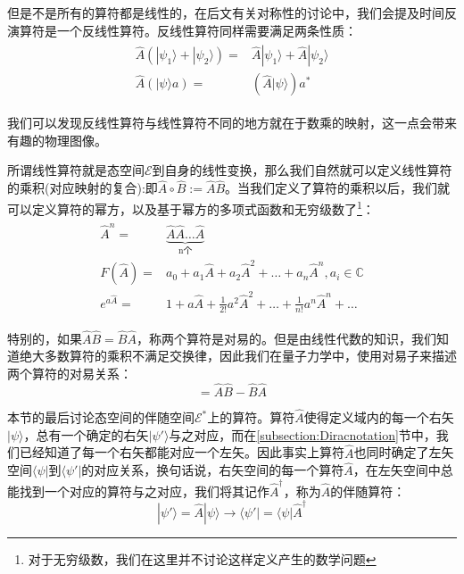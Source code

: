         但是不是所有的算符都是线性的，在后文有关对称性的讨论中，我们会提及时间反演算符是一个反线性算符。反线性算符同样需要满足两条性质：
        \begin{align}
            \begin{split}
                    \hat{A}(|\psi_1\rangle+|\psi_2\rangle)=&\hat{A}|\psi_1\rangle+\hat{A}|\psi_2\rangle\\
                \hat{A}(|\psi\rangle a)=&(\hat{A}|\psi\rangle)a^*
            \end{split}
        \end{align}
        
        我们可以发现反线性算符与线性算符不同的地方就在于数乘的映射，这一点会带来有趣的物理图像。
        
        所谓线性算符就是态空间$\mathcal{E}$到自身的线性变换，那么我们自然就可以定义线性算符的乘积(对应映射的复合):即$\hat{A}\circ\hat{B}:=\hat{A}\hat{B}$。当我们定义了算符的乘积以后，我们就可以定义算符的幂方，以及基于幂方的多项式函数和无穷级数了\footnote{对于无穷级数，我们在这里并不讨论这样定义产生的数学问题}：
        \begin{align}
            \begin{split}
                \hat{A}^n=&\underbrace{\hat{A}\hat{A}\dots\hat{A}}_{\textrm{n个}}\\
              F(\hat{A})=&a_0+a_1\hat{A}+a_2\hat{A}^2+\dots+a_n\hat{A}^n,a_i\in\mathbb{C}\\
              e^{a\hat{A}}  =&1+a\hat{A}+\frac{1}{2!}a^2\hat{A}^2+\dots+\frac{1}{n!}a^n\hat{A}^n+\dots
            \end{split}
        \end{align}
        
        特别的，如果$\hat{A}\hat{B}=\hat{B}\hat{A}$，称两个算符是对易的。但是由线性代数的知识，我们知道绝大多数算符的乘积不满足交换律，因此我们在量子力学中，使用对易子来描述两个算符的对易关系：
        \begin{equation}
            [\hat{A},\hat{B}]=\hat{A}\hat{B}-\hat{B}\hat{A}
        \end{equation}
        
        本节的最后讨论态空间的伴随空间$\mathscr{E}^*$上的算符。算符$\hat{A}$使得定义域内的每一个右矢$|\psi\rangle$，总有一个确定的右矢$|\psi'\rangle$与之对应，而在\ref{subsection:Diracnotation}节中，我们已经知道了每一个右矢都能对应一个左矢。因此事实上算符$\hat{A}$也同时确定了左矢空间$\langle\psi|$到$\langle\psi'|$的对应关系，换句话说，右矢空间的每一个算符$\hat{A}$，在左矢空间中总能找到一个对应的算符与之对应，我们将其记作$\hat{A}^\dagger$，称为$\hat{A}$的伴随算符：
        \begin{equation}
            |\psi'\rangle=\hat{A}|\psi\rangle\rightarrow\langle \psi'|=\langle\psi|\hat{A}^\dagger
        \end{equation}
        
